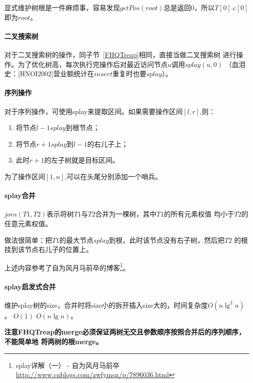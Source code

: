 显式维护树根是一件麻烦事，容易发现$getPos(root)$总是返回0，所以$T[0].c[0]$
即为$root$。

\paragraph{二叉搜索树}

对于二叉搜索树的操作，同子节~\ref{FHQTreap}相同，直接当做二叉搜索树
进行操作。为了优化树高，每次执行完操作后对最近访问节点$u$调用$splay(u,0)$
（血泪史：[HNOI2002]营业额统计在$insert$重复时也要$splay$）。

\paragraph{序列操作}

对于序列操作，可使用splay来提取区间。如果需要操作区间$[l,r]$,则：

\begin{enumerate}
	\item 将节点$l-1 splay$到根节点；
	\item 将节点$r+1 splay$到$l-1$的右儿子上；
	\item 此时$r+1$的左子树就是目标区间。
\end{enumerate}

为了操作区间$[1,n]$,可以在头尾分别添加一个哨兵。

\paragraph{splay合并}

$join(T1,T2)$表示将树$T1$与$T2$合并为一棵树，其中$T1$的所有元素权值
均小于$T2$的任意元素权值。

做法很简单：把$T1$的最大节点$splay$到根，此时该节点没有右子树，然后把$T2$
的根挂到该节点右儿子的位置上。

上述内容参考了自为风月马前卒的博客\footnote{splay详解（一） - 自为风月马前卒
	\url{http://www.cnblogs.com/zwfymqz/p/7896036.html}}。

\paragraph{splay启发式合并}
维护splay树的size，合并时将size小的拆开插入size大的，时间复杂度$O(n\lg^2n)$。
$O(1)$
$O(n\lg n)$。

{\bfseries 注意FHQTreap的merge必须保证两树无交且参数顺序按照合并后的序列顺序，不能简单地
将两树的根merge。}

